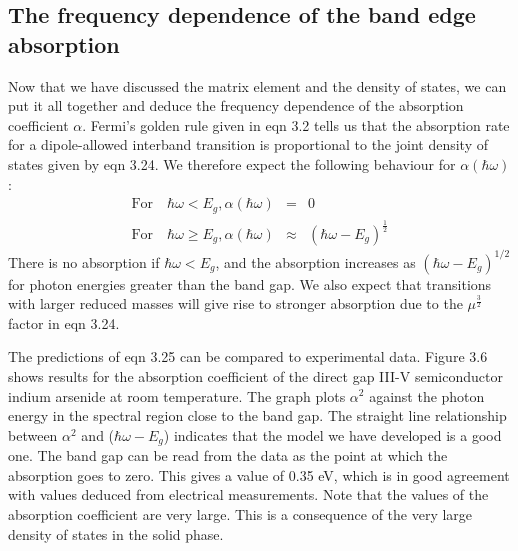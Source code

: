 \documentclass[12pt]{book}
\begin{document}
\subsection{The frequency dependence of the band edge absorption}
Now that we have discussed the matrix element and the density of states, we can put it all together and deduce the frequency dependence of the absorption coefficient $\alpha$. Fermi's golden rule given in eqn 3.2 tells us that the absorption rate for a dipole-allowed interband transition is proportional to the joint density of states given by eqn 3.24. We therefore expect the following behaviour for $\alpha(\hbar\omega)$:
\begin{eqnarray}
 \text{For}\quad \hbar\omega<E_g,\alpha(\hbar\omega) &=& 0 \\
 \text{For}\quad \hbar\omega\ge E_g,\alpha(\hbar\omega)&\approx& (\hbar\omega-E_g)^{\frac{1}{2}}
\end{eqnarray}
There is no absorption if $\hbar\omega< E_g$, and the absorption increases as $(\hbar\omega-E_g)^{1/2}$ for photon energies greater than the band gap. We also expect that transitions with larger reduced masses will give rise to stronger absorption due to the $\mu^{\frac{3}{2}}$ factor in eqn 3.24.

The predictions of eqn 3.25 can be compared to experimental data. Figure 3.6 shows results for the absorption coefficient of the direct gap III-V semiconductor indium arsenide at room temperature. The graph plots $\alpha^2$ against the photon energy in the spectral region close to the band gap. The straight line relationship between $\alpha^2$ and ($\hbar\omega-E_g$) indicates that the model we have developed is a good one. The band gap can be read from the data as the point at which the absorption goes to zero. This gives a value of 0.35 eV, which is in good agreement with values deduced from electrical measurements. Note that the values of the absorption coefficient are very large. This is a consequence of the very large density of states in the solid phase.
\end{document}

